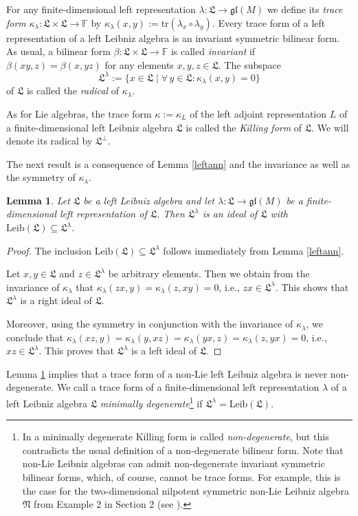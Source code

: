 \documentclass{amsart}
\newtheorem{lem}[thm]{Lemma}
\numberwithin{equation}{section}
\newcommand{\tr}{\mathrm{tr}}
\newcommand{\leib}{\mathrm{Leib}}
\newcommand{\F}{\mathbb{F}}
\newcommand{\lf}{\mathfrak{L}}
\newcommand{\nf}{\mathfrak{N}}
\newcommand{\gl}{\mathfrak{gl}}
\begin{document}
For any finite-dimensional left representation $\lambda:\lf\to\gl(M)$ we define its {\em trace
form\/} $\kappa_\lambda:\lf\times\lf\to\F$ by $\kappa_\lambda(x,y):=\tr(\lambda_x\circ
\lambda_y)$. Every trace form of a left representation of a left Leibniz algebra is an invariant
symmetric bilinear form. As usual, a bilinear form $\beta:\lf\times\lf\to\F$ is called {\it invariant\/}
if $\beta(xy,z)=\beta(x,yz)$ for any elements $x,y,z\in\lf$. The subspace $$\lf^\lambda:=
\{x\in\lf\mid\forall\,y\in\lf:\kappa_\lambda(x,y)=0\}$$ of $\lf$ is called the {\em radical\/} of
$\kappa_\lambda$.
\vspace{.2cm}

 As for Lie algebras, the trace form $\kappa:=\kappa_L$ of the left
adjoint representation $L$ of a finite-dimensional left Leibniz algebra $\lf$ is called the {\em
Killing form\/} of $\lf$. We will denote its radical by $\lf^\perp$.
\vspace{.2cm}

The next result is a consequence of Lemma \ref{leftann} and the invariance as well as the
symmetry of $\kappa_\lambda$.

\begin{lem}\label{leftrad}
Let $\lf$ be a left Leibniz algebra and let $\lambda:\lf\to\gl(M)$ be a finite-dimensional left
representation of $\lf$. Then $\lf^\lambda$ is an ideal of $\lf$ with $\leib(\lf)\subseteq
\lf^\lambda$.
\end{lem}

\begin{proof}
The inclusion $\leib(\lf)\subseteq\lf^\lambda$ follows immediately from Lemma \ref{leftann}.

Let $x,y\in\lf$ and $z\in\lf^\lambda$ be arbitrary elements. Then we obtain from the invariance of
$\kappa_\lambda$ that $\kappa_\lambda(zx,y)=\kappa_\lambda(z,xy)=0$, i.e., $zx\in\lf^\lambda$.
This shows that $\lf^\lambda$ is a right ideal of $\lf$.

Moreover, using the symmetry in conjunction with the invariance of $\kappa_\lambda$, we conclude
that $\kappa_\lambda(xz,y)=\kappa_\lambda(y,xz)=\kappa_\lambda(yx,z)=\kappa_\lambda(z,yx)
=0$, i.e., $xz\in\lf^\lambda$. This proves that $\lf^\lambda$ is a left ideal of $\lf$.
\end{proof}

Lemma \ref{leftrad} implies that a trace form of a non-Lie left Leibniz algebra is never non-degenerate.
We call a trace form of a finite-dimensional left representation $\lambda$ of a left Leibniz algebra $\lf$
{\em minimally degenerate\/}\footnote{In \cite[Definition 5.6]{DMS1} a minimally degenerate Killing
form is called {\em non-degenerate\/}, but this contradicts the usual definition of a non-degenerate
bilinear form. Note that non-Lie Leibniz algebras can admit non-degenerate invariant symmetric bilinear
forms, which, of course, cannot be trace forms. For example, this is the case for the two-dimensional
nilpotent symmetric non-Lie Leibniz algebra $\nf$ from Example 2 in Section 2 (see \cite[Example 2.2]{BH}).}
if $\lf^\lambda=\leib(\lf)$.
\vspace{.2cm}
\end{document}
